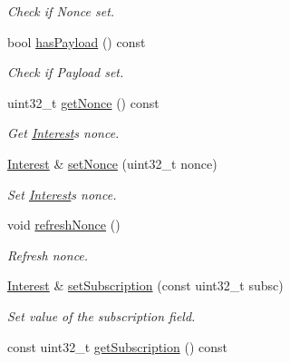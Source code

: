\begin{DoxyCompactItemize}
\begin{DoxyCompactList}\small\item\em Check if Nonce set. \end{DoxyCompactList}\item 
bool \hyperlink{classndn_1_1Interest_a13157c8db3043c4c664fc2fe64dd0bcf}{has\+Payload} () const\hypertarget{classndn_1_1Interest_a13157c8db3043c4c664fc2fe64dd0bcf}{}\label{classndn_1_1Interest_a13157c8db3043c4c664fc2fe64dd0bcf}

\begin{DoxyCompactList}\small\item\em Check if Payload set. \end{DoxyCompactList}\item 
uint32\+\_\+t \hyperlink{classndn_1_1Interest_a22d118791490792b542bf2c19923aca6}{get\+Nonce} () const
\begin{DoxyCompactList}\small\item\em Get \hyperlink{classndn_1_1Interest}{Interest}\textquotesingle{}s nonce. \end{DoxyCompactList}\item 
\hyperlink{classndn_1_1Interest}{Interest} \& \hyperlink{classndn_1_1Interest_aac96fe2d1fe38a936d8b49e6cc722ee2}{set\+Nonce} (uint32\+\_\+t nonce)
\begin{DoxyCompactList}\small\item\em Set \hyperlink{classndn_1_1Interest}{Interest}\textquotesingle{}s nonce. \end{DoxyCompactList}\item 
void \hyperlink{classndn_1_1Interest_a9ed4c9006bec5d9c89a7154dca362f9b}{refresh\+Nonce} ()
\begin{DoxyCompactList}\small\item\em Refresh nonce. \end{DoxyCompactList}\item 
\hyperlink{classndn_1_1Interest}{Interest} \& \hyperlink{classndn_1_1Interest_a796b182a768e28162fbe3dec8dfe51b0}{set\+Subscription} (const uint32\+\_\+t subsc)\hypertarget{classndn_1_1Interest_a796b182a768e28162fbe3dec8dfe51b0}{}\label{classndn_1_1Interest_a796b182a768e28162fbe3dec8dfe51b0}

\begin{DoxyCompactList}\small\item\em Set value of the subscription field. \end{DoxyCompactList}\item 
const uint32\+\_\+t \hyperlink{classndn_1_1Interest_a9ac77914075ea847df64431fe87e1017}{get\+Subscription} () const\hypertarget{classndn_1_1Interest_a9ac77914075ea847df64431fe87e1017}{}\label{classndn_1_1Interest_a9ac77914075ea847df64431fe87e1017}


\end{DoxyCompactItemize}
